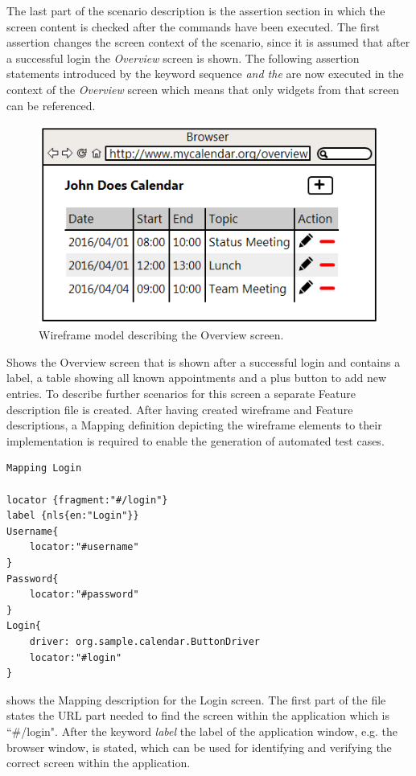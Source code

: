 \documentclass{sig-alternate-05-2015}
\begin{document}
The last part of the scenario description is the assertion section in which the screen content is checked after the commands have been executed.
The first assertion changes the screen context of the scenario, since it is assumed that after a successful login the \textit{Overview} screen is shown.
The following assertion statements introduced by the keyword sequence \textit{and the} are now executed in the context of the \textit{Overview} screen which means that only widgets from that screen can be referenced.

\begin{figure}[h]
	\centering
	\includegraphics[width=0.8\linewidth]{Overview.png}
	\caption{Wireframe model describing the Overview screen.}
	\label{fig:overview}
\end{figure}

 Shows the Overview screen that is shown after a successful login and contains a label, a table showing all known appointments and a plus button to add new entries.
To describe further scenarios for this screen a separate Feature description file is created.
After having created wireframe and Feature descriptions, a Mapping definition depicting the wireframe elements to their implementation is required to enable the generation of automated test cases.

\begin{lstlisting}[captionpos=b, caption=Mapping Description: Login Screen., label={lst:mappinglogin}, language=dsl]
Mapping Login

locator {fragment:"#/login"}
label {nls{en:"Login"}}
Username{
	locator:"#username"
}
Password{
	locator:"#password"
}
Login{ 
    driver: org.sample.calendar.ButtonDriver
    locator:"#login"
}
\end{lstlisting}

 shows the Mapping description for the Login screen.
The first part of the file states the URL part needed to find the screen within the application which is ``\#/login". 
After the keyword \textit{label} the label of the application window, e.g. the browser window, is stated, which can be used for identifying and verifying the correct screen within the application.
\end{document}
